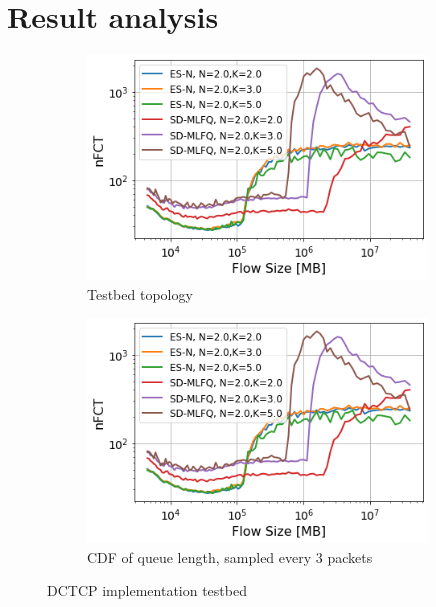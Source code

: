 \section{Result analysis}
\begin{figure}
	\centering
	\begin{subfigure}{.5\textwidth}
		\centering
		\includegraphics[width=0.99\textwidth]{Chapter4/Figures/fct_detailed_fixed_N_2}
		\caption{Testbed topology}

	\end{subfigure}%
	\hfill
	\begin{subfigure}{.5\textwidth}
		\centering
		\includegraphics[width=0.99\textwidth]{Chapter4/Figures/fct_detailed_fixed_N_2}
		\caption{CDF of queue length, sampled every 3 packets}

	\end{subfigure}%
	\caption{DCTCP implementation testbed}

\end{figure}%